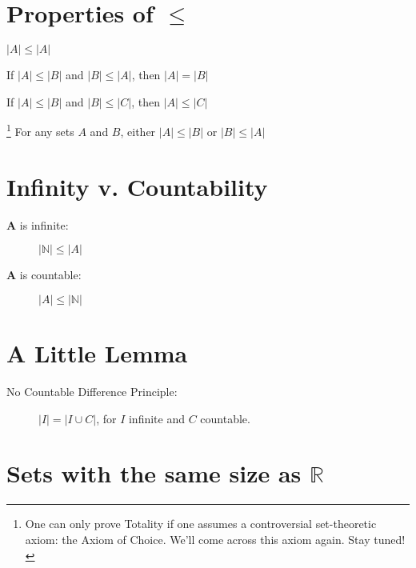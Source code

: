 \documentclass[12pt]{extarticle}
\begin{document}
\vspace{1mm}
\section{Properties of $\leq$}


\begin{description}\label{gloss:partial-order}

\item[Reflexivity]
$|A|\leq |A|$

\item[Anti-symmetry] If $|A|\leq
|B|$ and $|B|\leq |A|$, then $|A|= |B|$


\item[Transitivity] If $|A|\leq
|B|$ and
$|B|\leq
|C|$, then
$|A|\leq |C|$
\item[Totality]\hspace{-2.2mm}\footnote{One can only prove Totality if one assumes a controversial set-theoretic axiom: the Axiom of Choice. We'll come across this axiom again. Stay tuned!} 
For any sets $A$ and $B$, either
$|A|\leq |B|$ or $|B|\leq |A|$
\end{description}

\section{Infinity v. Countability}

\begin{description}
\item[$\bm A$ is infinite:]  $|\mathbb{N}| \leq |A|$

\item[$\bm A$ is countable:] $|A| \leq |\mathbb{N}|$
\end{description}



\section{A Little Lemma}


\begin{description}
\item[No Countable Difference Principle:] 
\(|I| = |I \cup C|\), for $I$ infinite and $C$ countable.

\end{description}



\section{Sets with the same size as $\mathbb{R}$}
\end{document}
